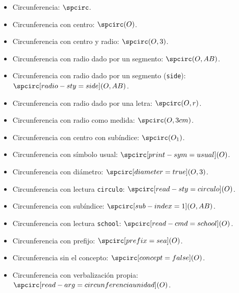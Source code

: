 \documentclass{article}
\begin{document}
\begin{itemize}
  \item Circunferencia: $\spcirc$.
  \item Circunferencia con centro: $\spcirc(O)$.
  \item Circunferencia con centro y radio: $\spcirc(O,3)$.
  \item Circunferencia con radio dado por un segmento: $\spcirc(O, AB)$.
  \item Circunferencia con radio dado por un segmento (\texttt{side}): $\spcirc[radio-sty=side](O, AB)$.
  \item Circunferencia con radio dado por una letra: $\spcirc(O, r)$.
  \item Circunferencia con radio como medida: $\spcirc(O,3 cm)$.
  \item Circunferencia con centro con subíndice: $\spcirc(O_{1})$.
  \item Circunferencia con símbolo usual: $\spcirc[print-sym=usual](O)$.
  \item Circunferencia con diámetro: $\spcirc[diameter=true](O,3)$.
  \item Circunferencia con lectura \texttt{circulo}: $\spcirc[read-sty=circulo](O)$.
  \item Circunferencia con subíndice: $\spcirc[sub-index={1}](O, AB)$.
  \item Circunferencia con lectura \texttt{school}: $\spcirc[read-cmd=school](O)$.
  \item Circunferencia con prefijo: $\spcirc[prefix={sea}](O)$.
  \item Circunferencia sin el concepto: $\spcirc[concept=false](O)$.
  \item Circunferencia con verbalización propia: $\spcirc[read-arg={circunferencia unidad}](O)$.

\end{itemize}
\end{document}

